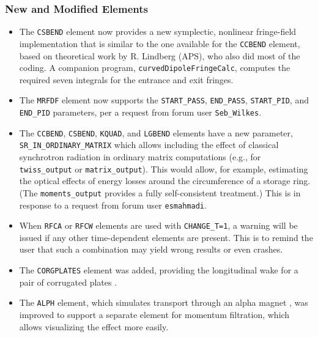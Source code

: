 \documentclass[11pt]{article}
\begin{document}
\subsubsection{New and Modified Elements}
\begin{itemize}
\item The \verb|CSBEND| element now provides a new symplectic, nonlinear fringe-field implementation that is similar to the
  one available for the \verb|CCBEND| element, based on theoretical work by R. Lindberg (APS), who also did most of the coding.
  A companion program, \verb|curvedDipoleFringeCalc|, computes the required seven integrals for the entrance
  and exit fringes.
\item The \verb|MRFDF| element now supports the \verb|START_PASS|, \verb|END_PASS|, \verb|START_PID|, and
  \verb|END_PID| parameters, per a request from forum user \verb|Seb_Wilkes|.
\item The \verb|CCBEND|, \verb|CSBEND|,  \verb|KQUAD|, and \verb|LGBEND| elements have a new parameter, \verb|SR_IN_ORDINARY_MATRIX|
  which allows including the effect of classical synchrotron radiation in ordinary matrix computations (e.g., for \verb|twiss_output|
  or \verb|matrix_output|). This would allow, for example, estimating the optical effects of energy losses around the circumference
  of a storage ring. (The \verb|moments_output| provides a fully self-consistent treatment.) This is in response to a 
  request from forum user \verb|esmahmadi|.
\item When \verb|RFCA| or \verb|RFCW| elements are used with \verb|CHANGE_T=1|, a warning will be issued if any other
  time-dependent elements are present. This is to remind the user that such a combination may yield wrong results or
  even crashes.
\item The \verb|CORGPLATES| element was added, providing the longitudinal wake for a pair of corrugated plates \cite{Zhang-PRSTAB-18-010702}.
\item The \verb|ALPH| element, which simulates transport through an alpha magnet \cite{Enge}, was improved to support 
  a separate element for momentum filtration, which allows visualizing the effect more easily.
\end{itemize}
\end{document}
